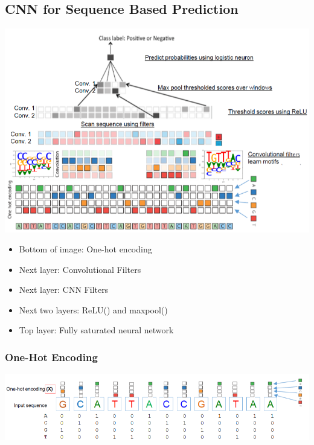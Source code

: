 \documentclass[10pt]{article}
\begin{document}
\subsection*{CNN for Sequence Based Prediction}
\begin{center} 
	\includegraphics*[width=\textwidth]{W8_12.png} 
\end{center}
\begin{itemize}
	\item Bottom of image: One-hot encoding
	\item Next layer: Convolutional Filters
	\item Next layer: CNN Filters
	\item Next two layers: ReLU() and maxpool()
	\item Top layer: Fully saturated neural network
\end{itemize}

\subsubsection*{One-Hot Encoding}
\begin{center} 
	\includegraphics*[width=\textwidth]{W8_13.png} 
\end{center}
\end{document}

